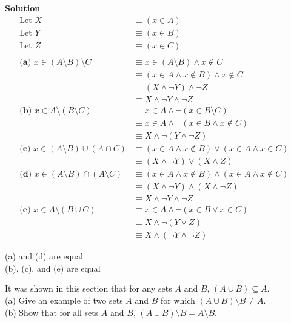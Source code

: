 \textbf{Solution}
\begin{align*}
\text{Let } X &\equiv (x \in A) & \\
\text{Let } Y &\equiv (x \in B) & \\
\text{Let } Z &\equiv (x \in C) & \\& \\
\textbf{(a) } x \in (A \setminus B) \setminus C 
    &\equiv x \in (A \setminus B) \wedge x \not \in C & \\
    &\equiv (x \in A \wedge x \not \in B) \wedge x \not \in C & \\
    &\equiv (X \wedge \neg Y) \wedge \neg Z & \\
    &\equiv X \wedge \neg Y \wedge \neg Z & \\ 
\textbf{(b) } x \in A \setminus (B \setminus C) 
    &\equiv x \in A \wedge \neg(x \in B \setminus C) & \\
    &\equiv x \in A \wedge \neg(x \in B \wedge x \not \in C) & \\
    &\equiv X \wedge \neg(Y \wedge \neg Z) & \\
\textbf{(c) } x \in (A \setminus B) \cup (A \cap C) 
    &\equiv (x \in A \wedge x \not \in B) \vee (x \in A \wedge x \in C) & \\
    &\equiv (X \wedge \neg Y) \vee (X \wedge Z) & \\ 
\textbf{(d) } x \in (A \setminus B) \cap (A \setminus C) 
    &\equiv (x \in A \wedge x \not \in B) \wedge (x \in A \wedge x \not \in C) & \\
    &\equiv (X \wedge \neg Y) \wedge (X \wedge \neg Z) & \\ 
    &\equiv X \wedge \neg Y \wedge \neg Z & \\ 
\textbf{(e) } x \in A \setminus (B \cup C) 
    &\equiv x \in A \wedge \neg (x \in B \vee x \in C) & \\
    &\equiv X \wedge \neg (Y \vee Z) & \\
    &\equiv X \wedge (\neg Y \wedge \neg Z) 
\end{align*}

(a) and (d) are equal \\
(b), (c), and (e) are equal

\begin{tcolorbox}[title=Problem 10, breakable]
It was shown in this section that for any sets $A$ and $B$, $(A \cup B) \subseteq A$. \\
(a) Give an example of two sets $A$ and $B$ for which $(A \cup B) \setminus B \not = A$. \\
(b) Show that for all sets $A$ and $B$, $(A \cup B) \setminus B = A \setminus B$.
\end{tcolorbox}

